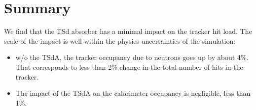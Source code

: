 \documentclass[12pt]{article}
\begin{document}


\section {Summary}

We find that the TSd absorber has a minimal impact on the tracker hit load.
The scale of the impact is well within the physics uncertainties of the simulation:
\begin{itemize}
\item 
  w/o the TSdA, the tracker occupancy due to neutrons goes up
  by about 4\%.  That corresponds to less than 2\% change in the total number
  of hits in the tracker.
\item 
%
  The impact of the TSdA on the calorimeter occupancy is negligible,
  less than 1\%.
\end{itemize}

%
\newpage



% 

\end{document}
